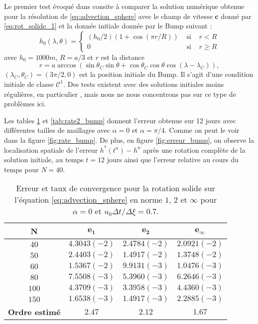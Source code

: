 Le premier test évoqué dans \cite{Williamson1992} consite à comparer la solution numérique obtenue pour la résolution de \eqref{eq:advection_sphere} avec le champ de vitesse $\mathbf{c}$ donné par \eqref{eq:rot_solide_1} et la donnée initiale donnée par le Bump suivant :
\begin{equation}
h_0(\lambda, \theta) = \left\lbrace
\begin{array}{ccl}
(h_0/2) (1 + \cos (\pi r/R) ) & \text{ si } & r<R \\
0 & \text{ si } & r \geq R
\end{array}
\right.
\label{eq:initial_solid_body}
\end{equation}
avec $h_0 = 1000 \si{m}$, $R=a/3$ et $r$ est la distance 
\begin{equation}
r = a \arccos \left( \sin \theta_C \sin \theta + \cos \theta_C \cos \theta \cos (\lambda - \lambda_C) \right),
\end{equation}
$(\lambda_C, \theta_C) = (3 \pi / 2 , 0)$ est la position initiale du Bump. Il s'agit d'une condition initiale de classe $\mathcal{C}^1$. Des tests existent avec des solutions initiales moins régulières, en particulier \cite{Nair2010}, mais nous ne nous concentrons pas sur ce type de problèmes ici.

Les tables \ref{tab:rate1_bump} et \ref{tab:rate2_bump} donnent l'erreur obtenue sur 12 jours avec différentes tailles de maillages avec $\alpha=0$ et $\alpha = \pi/4$. Comme on peut le voir dans la figure \ref{fig:rate_bump}. De plus, en figure \ref{fig:erreur_bump}, on observe la localisation spatiale de l'erreur $h^*(t^n) - h^n$ après une rotation complète de la solution initiale, au temps $t=12$ jours ainsi que l'erreur relative au cours du temps pour $N=40$.

\begin{table}[htbp]
\begin{center}
\begin{tabular}{|c||c|c|c|}
\hline
\textbf{N}  & $\mathbf{e_1}$ & $\mathbf{e_2}$ & $\mathbf{e_{\infty}}$\\
\hline
\hline
$40$  & $4.3043 (-2)$ & $2.4784 (-2)$ & $2.0921 (-2)$ \\
$50$  & $2.4403 (-2)$ & $1.4917 (-2)$ & $1.3748 (-2)$ \\
$60$  & $1.5367 (-2)$ & $9.9131 (-3)$ & $1.0476 (-3)$ \\
$80$  & $7.5508 (-3)$ & $5.3960 (-3)$ & $6.2646 (-3)$ \\
$100$  & $4.3709 (-3)$ & $3.3958 (-3)$ & $4.4360 (-3)$ \\
$150$  & $1.6538 (-3)$ & $1.4917 (-3)$ & $2.2885 (-3)$ \\
\hline 
\hline
\textbf{Ordre estimé}& $2.47$ & $2.12$ & $1.67$\\
\hline
\end{tabular}
\end{center}
\caption{Erreur et taux de convergence pour la rotation solide sur l'équation \eqref{eq:advection_sphere} en norme $1$, $2$ et $\infty$ pour $\alpha = 0$ et $u_0 \Delta t / \Delta \xi = 0.7$.}
\label{tab:rate1_bump}
\end{table} 


